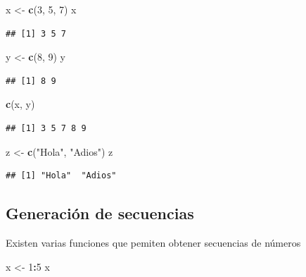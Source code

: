 \documentclass[]{book}
\newenvironment{Shaded}{\begin{snugshade}}{\end{snugshade}}
\newcommand{\KeywordTok}[1]{\textcolor[rgb]{0.13,0.29,0.53}{\textbf{#1}}}
\newcommand{\DecValTok}[1]{\textcolor[rgb]{0.00,0.00,0.81}{#1}}
\newcommand{\StringTok}[1]{\textcolor[rgb]{0.31,0.60,0.02}{#1}}
\newcommand{\OperatorTok}[1]{\textcolor[rgb]{0.81,0.36,0.00}{\textbf{#1}}}
\newcommand{\NormalTok}[1]{#1}
\begin{document}
\begin{Shaded}
\begin{Highlighting}[]
\NormalTok{x <-}\StringTok{ }\KeywordTok{c}\NormalTok{(}\DecValTok{3}\NormalTok{, }\DecValTok{5}\NormalTok{, }\DecValTok{7}\NormalTok{)}
\NormalTok{x}
\end{Highlighting}
\end{Shaded}

\begin{verbatim}
## [1] 3 5 7
\end{verbatim}

\begin{Shaded}
\begin{Highlighting}[]
\NormalTok{y <-}\StringTok{ }\KeywordTok{c}\NormalTok{(}\DecValTok{8}\NormalTok{, }\DecValTok{9}\NormalTok{)}
\NormalTok{y}
\end{Highlighting}
\end{Shaded}

\begin{verbatim}
## [1] 8 9
\end{verbatim}

\begin{Shaded}
\begin{Highlighting}[]
\KeywordTok{c}\NormalTok{(x, y)}
\end{Highlighting}
\end{Shaded}

\begin{verbatim}
## [1] 3 5 7 8 9
\end{verbatim}

\begin{Shaded}
\begin{Highlighting}[]
\NormalTok{z <-}\StringTok{ }\KeywordTok{c}\NormalTok{(}\StringTok{"Hola"}\NormalTok{, }\StringTok{"Adios"}\NormalTok{)}
\NormalTok{z}
\end{Highlighting}
\end{Shaded}

\begin{verbatim}
## [1] "Hola"  "Adios"
\end{verbatim}

\subsection{Generación de secuencias}\label{generacion-de-secuencias}

Existen varias funciones que pemiten obtener secuencias de números

\begin{Shaded}
\begin{Highlighting}[]
\NormalTok{x <-}\StringTok{ }\DecValTok{1}\OperatorTok{:}\DecValTok{5}
\NormalTok{x}
\end{Highlighting}
\end{Shaded}
\end{document}
